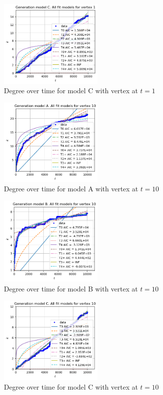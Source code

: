 \documentclass[a4paper]{article}
\begin{document}
%
\begin{figure}[H]
		\centering
		\includegraphics[width=0.45\textwidth]{modelC/all_dt1.png}
		\caption{Degree over time for model C with vertex at $t=1$}
\end{figure}
%
\begin{figure}[H]
    \centering
		\includegraphics[width=0.45\textwidth]{modelA/all_dt10.png}
		\caption{Degree over time for model A with vertex at $t=10$}
\end{figure}
%
\begin{figure}[H]
    \centering
		\includegraphics[width=0.45\textwidth]{modelB/all_dt10.png}
		\caption{Degree over time for model B with vertex at $t=10$}
\end{figure}
%
\begin{figure}[H]
		\centering
		\includegraphics[width=0.45\textwidth]{modelC/all_dt10.png}
		\caption{Degree over time for model C with vertex at $t=10$}
\end{figure}
\end{document}

